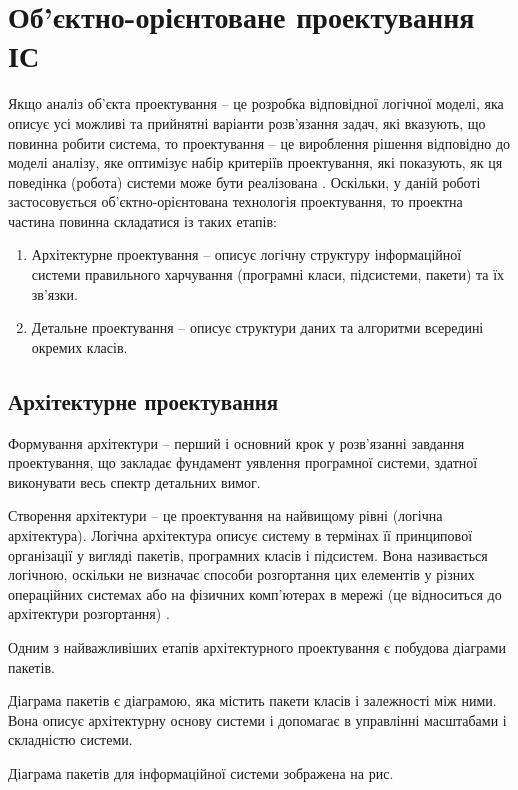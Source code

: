 \documentclass[../main.tex]{subfiles}
\begin{document}
\chapter{Об’єктно-орієнтоване проектування ІС}

Якщо аналіз об’єкта проектування – це розробка відповідної логічної моделі, яка описує усі можливі та прийнятні варіанти розв’язання задач, які вказують, що повинна робити система, то проектування – це вироблення рішення відповідно до моделі аналізу, яке оптимізує набір критеріїв проектування, які  показують, як ця поведінка (робота) системи може бути реалізована \cite{diploma_guidelines}.
Оскільки, у даній роботі застосовується об’єктно-орієнтована технологія проектування, то проектна частина повинна складатися із таких етапів:

\begin{enumerate}
	\item Архітектурне проектування – описує логічну структуру інформаційної системи правильного харчування (програмні класи, підсистеми,  пакети) та їх зв’язки.
	\item Детальне проектування – описує структури даних та алгоритми всередині окремих класів. 
\end{enumerate}

\section{Архітектурне проектування}
Формування архітектури – перший і основний крок у розв’язанні завдання проектування, що закладає фундамент уявлення програмної системи, здатної виконувати весь спектр детальних вимог. \cite{diploma_guidelines2}

Створення архітектури – це проектування на найвищому рівні (логічна архітектура). Логічна архітектура описує систему в термінах її принципової організації у вигляді пакетів, програмних класів і підсистем. Вона називається логічною, оскільки не визначає способи розгортання цих елементів у різних операційних системах або на фізичних комп’ютерах в мережі (це відноситься до архітектури розгортання) \cite{diploma_guidelines}.

Одним з найважливіших етапів архітектурного проектування є побудова діаграми пакетів. 

Діаграма пакетів є діаграмою, яка містить пакети класів і залежності між ними. Вона описує архітектурну основу системи і допомагає в управлінні масштабами і складністю системи.

Діаграма пакетів для інформаційної системи зображена на рис. 
\end{document}
